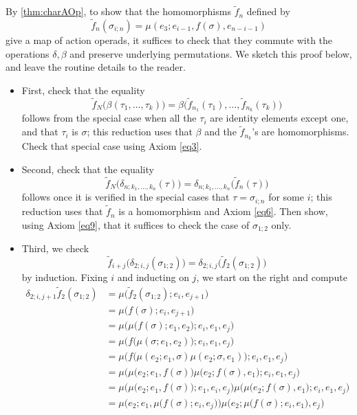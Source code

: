 \begin{example}
By \cref{thm:charAOp}, to show that the homomorphisms $\tilde{f}_n$ defined by
\[
\tilde{f}_n(\sigma_{i;n}) = \mu(e_3; e_{i-1}, f(\sigma), e_{n-i-1})
\]
give a map of action operads, it suffices to check that they commute with the operations $\delta, \beta$ and preserve underlying permutations.
We sketch this proof below, and leave the routine details to the reader.
\begin{itemize}
\item First, check that the equality
\[
\tilde{f}_N\big( \beta(\tau_1, \ldots, \tau_k) \big) = \beta\big( \tilde{f}_{n_1}(\tau_1), \ldots, \tilde{f}_{n_k}(\tau_k) \big)
\]
follows from the special case when all the $\tau_i$ are identity elements except one, and that $\tau_i$ is $\sigma$; this reduction uses that $\beta$ and the $\tilde{f}_{n_k}$'s are homomorphisms. Check that special case using Axiom \eqref{eq3}.
\item Second, check that the equality
\[
\tilde{f}_N\big( \delta_{n; k_1, \ldots, k_n}(\tau) \big) = \delta_{n; k_1, \ldots, k_n}\big( \tilde{f}_n(\tau) \big) 
\]
follows once it is verified in the special cases that $\tau = \sigma_{i;n}$ for some $i$; this reduction uses that $\tilde{f}_n$ is a homomorphism and Axiom \eqref{eq6}.
Then show, using Axiom \eqref{eq9}, that it suffices to check the case of $\sigma_{1;2}$ only.
\item Third, we check
\[
\tilde{f}_{i+j}\big( \delta_{2; i,j}(\sigma_{1;2}) \big) = \delta_{2; i,j}\big( \tilde{f}_2(\sigma_{1;2}) \big) 
\]
by induction. Fixing $i$ and inducting on $j$, we start on the right and compute
\begin{align*}
\delta_{2; i, j+1} \tilde{f}_2(\sigma_{1;2}) & = \mu\big( \tilde{f}_2(\sigma_{1;2}); e_i, e_{j+1} \big)  \\
& = \mu \big( f(\sigma); e_i, e_{j+1} \big) \\
& = \mu \Big( \mu\big( f(\sigma); e_1, e_2 \big); e_i, e_1, e_j \Big) \\
& = \mu \Big( f\big(\mu(\sigma; e_1, e_2) \big); e_i, e_1, e_j \Big) \\
& = \mu \Big( f\big( \mu(e_2; e_1, \sigma) \mu(e_2; \sigma, e_1) \big); e_i, e_1, e_j \Big) \\
& = \mu \Big( \mu\big(e_2; e_1, f(\sigma)\big) \mu\big(e_2; f(\sigma), e_1 \big); e_i, e_1, e_j \Big) \\
& = \mu \Big( \mu\big(e_2; e_1, f(\sigma)\big); e_1, e_i, e_j\Big)
\mu\Big( \mu\big(e_2; f(\sigma), e_1 \big); e_i, e_1, e_j \Big) \\
& = \mu \Big(  e_2; e_1, \mu \big( f(\sigma); e_i, e_j \big) \Big) \mu \Big(  e_2; \mu \big( f(\sigma); e_i, e_1 \big), e_j \Big) \\

\end{align*}
\end{itemize}
\end{example}
